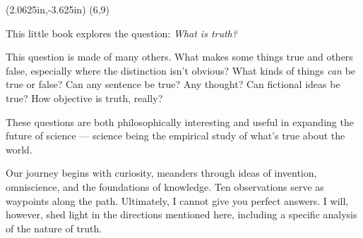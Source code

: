 \documentclass[9pt, twoside]{book}
\makeatletter
\def\convertto#1#2{\strip@pt\dimexpr #2*65536/\number\dimexpr 1#1}
\theoremstyle{argtstyle}
\makeatother
\begin{document}
\setlength{\cornersize}{0}
\fancyput(2.0625in,-3.625in){%
\setlength{\unitlength}{1in}\fancyoval(6,9)}

\thispagestyle{empty}
\phantom{.}
\newpage

\thispagestyle{empty}
\phantom{.}
\newpage

\thispagestyle{empty}
\null\vspace{1in}
\vspace{0.5in}

\newpage

\thispagestyle{empty}
\phantom{.}
\newpage

\setcounter{page}{1}

\vspace*{\fill}

\centerline{
This little book explores the question: {\em What is truth?}
}

\bigskip

This question is made of many others.
What makes some things true and
others false, especially where the distinction isn't obvious?
What kinds of things {\em can} be true or false? Can any sentence be true?
Any thought?
Can fictional ideas be true?
How objective is truth, really?

These questions are both philosophically interesting
and useful in expanding the future of science --- science being
the empirical study of what's true about the world.

Our journey begins with curiosity, meanders
through ideas of invention, omniscience, 
and the foundations of knowledge. Ten
observations serve as waypoints along the path.
Ultimately, I cannot give you perfect answers.
I will, however, shed light in the directions mentioned here,
including a specific analysis of the nature of truth.
\end{document}
